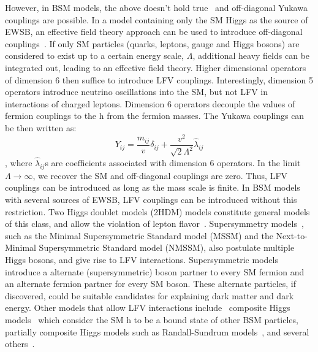 However, in BSM models, the above doesn't hold true~\cite{Harnik:2012pb} and off-diagonal Yukawa couplings are possible. In a model containing only the SM Higgs as the source of EWSB, an effective field theory approach can be used to introduce off-diagonal couplings~\cite{DiazCruz:1999xe}. If only SM particles (quarks, leptons, gauge and Higgs bosons) are considered to exist up to a certain energy scale, $\Lambda$, additional heavy fields can be integrated out, leading to an effective field theory. Higher dimensional operators of dimension 6 then suffice to introduce LFV couplings. Interestingly, dimension 5 operators introduce neutrino oscillations into the SM, but not LFV in interactions of charged leptons. Dimension 6 operators decouple the values of fermion couplings to the h from the fermion masses. The Yukawa couplings can be then written as:
\begin{equation}
  Y_{ij}=\frac{m_{ij}}{v}\delta_{ij}+\frac{v^2}{\sqrt{2}\Lambda^2}\hat{\lambda}_{ij}
\end{equation}
, where $\hat{\lambda}_{ij}$s are coefficients associated with dimension 6 operators. In the limit $\Lambda\rightarrow\infty$, we recover the SM and off-diagonal couplings are zero. Thus, LFV couplings can be introduced as long as the mass scale is finite.  In BSM models with several sources of EWSB, LFV couplings can be introduced without this restriction. Two Higgs doublet models (2HDM) models constitute general models of this class, and allow the violation of lepton flavor~\cite{PhysRevLett.38.622}. Supersymmetry models~\cite{Han:2000jz,Arganda:2004bz,Arhrib:2012ax,Arana-Catania:2013xma,Arganda:2015uca,Arganda:2015naa}, such as the Minimal Supersymmetric Standard model (MSSM) and the Next-to-Minimal Supersymmetric Standard model (NMSSM), also postulate multiple Higgs bosons, and give rise to LFV interactions. Supersymmetric models introduce a alternate (supersymmetric) boson partner to every SM fermion and an alternate fermion partner for every SM boson. These alternate particles, if discovered, could be suitable candidates for explaining dark matter and dark energy. Other models that allow LFV interactions include~\cite{HIG-17-001} composite Higgs models~\cite{Agashe:2009di,Azatov:2009na} which consider the SM h to be a bound state of other BSM particles, partially composite Higgs models such as Randall-Sundrum models~\cite{Perez:2008ee,Casagrande:2008hr,Buras:2009ka}, and several others~\cite{Blanke:2008zb,Giudice:2008uua,AguilarSaavedra:2009mx,Albrecht:2009xr,Goudelis:2011un,McKeen:2012av,Pilaftsis199268,PhysRevD.47.1080,Arganda:2014dta,Ishimori:2010au}.

